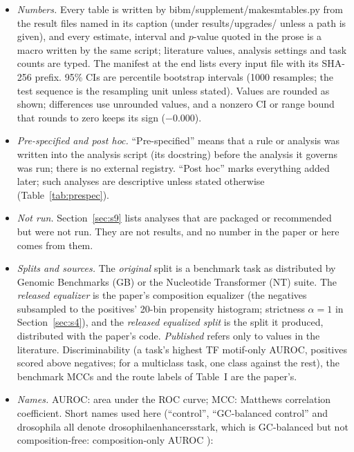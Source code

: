 \documentclass[journal,onecolumn,10pt,letterpaper]{IEEEtran}
\newcommand{\tasku}{\textunderscore\allowbreak}
\DeclareRobustCommand{\task}[1]{{\normalfont\ttfamily\upshape\let\_\tasku #1}}
\begin{document}
\begin{itemize}
\item \emph{Numbers.} Every table is written by \task{bibm/supplement/make\_sm\_tables.py} from the
result files named in its caption (under \task{results/upgrades/} unless a path is given), and every
estimate, interval and $p$-value quoted in the prose is a macro written by the same script;
literature values, analysis settings and task counts are typed. The manifest at the end lists every
input file with its SHA-256 prefix. 95\% CIs are percentile bootstrap intervals (1000 resamples; the
test sequence is the resampling unit unless stated). Values are rounded as shown; differences use
unrounded values, and a nonzero CI or range bound that rounds to zero keeps its sign ($-$0.000).
\item \emph{Pre-specified and post hoc.} ``Pre-specified'' means that a rule or analysis was written
into the analysis script (its docstring) before the analysis it governs was run; there is no
external registry. ``Post hoc'' marks everything added later; such analyses are descriptive unless
stated otherwise (Table~\ref{tab:prespec}).
\item \emph{Not run.} Section~\ref{sec:s9} lists analyses that are packaged or recommended but were
not run. They are not results, and no number in the paper or here comes from them.
\item \emph{Splits and sources.} The \emph{original} split is a benchmark task as distributed by
Genomic Benchmarks (GB) or the Nucleotide Transformer (NT) suite. The \emph{released equalizer} is the
paper's composition equalizer (the negatives subsampled to the positives' 20-bin propensity histogram;
strictness $\alpha{=}1$ in Section~\ref{sec:s4}), and the \emph{released equalized split} is the split
it produced, distributed with the paper's code. \emph{Published} refers only to values in the
literature. Discriminability (a task's highest TF motif-only AUROC, positives scored above negatives;
for a multiclass task, one class against the rest), the benchmark MCCs and the route labels of
Table~I are the paper's.
\item \emph{Names.} AUROC: area under the ROC curve; MCC: Matthews correlation coefficient.
Short names used here (``control'', ``GC-balanced control'' and
\task{drosophila} all denote \task{drosophila\_enhancers\_stark}, which is GC-balanced but not
composition-free: composition-only AUROC \smCtlComp):\\[2pt]
{\footnotesize\setlength{\tabcolsep}{3pt}\begin{tabular}{@{}ll@{\quad}ll@{}}

\end{tabular}}
\end{itemize}
\end{document}
